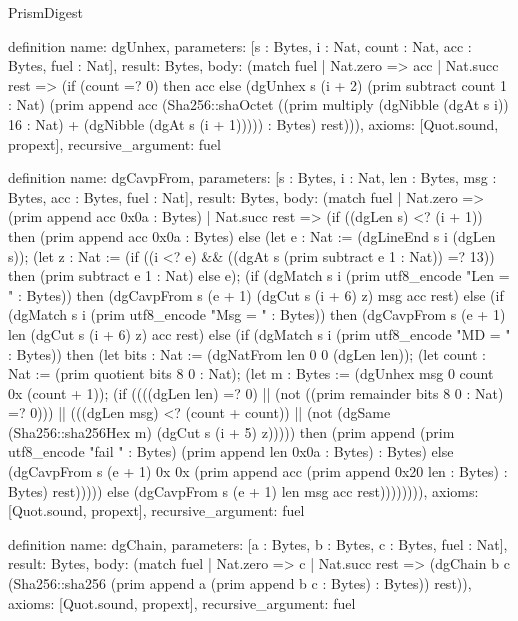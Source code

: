 \begin{lexlean}{PrismDigest}
\begin{semanticmodule}
definition{
  name: dgUnhex,
  parameters: [s : Bytes, i : Nat, count : Nat, acc : Bytes, fuel : Nat],
  result: Bytes,
  body: (match fuel
    | Nat.zero => acc
    | Nat.succ rest => (if (count =? 0) then acc else (dgUnhex s (i + 2) (prim subtract count 1 : Nat) (prim append acc (Sha256::shaOctet ((prim multiply (dgNibble (dgAt s i)) 16 : Nat) + (dgNibble (dgAt s (i + 1))))) : Bytes) rest))),
  axioms: [Quot.sound, propext],
  recursive_argument: fuel
}

definition{
  name: dgCavpFrom,
  parameters: [s : Bytes, i : Nat, len : Bytes, msg : Bytes, acc : Bytes, fuel : Nat],
  result: Bytes,
  body: (match fuel
    | Nat.zero => (prim append acc 0x0a : Bytes)
    | Nat.succ rest => (if ((dgLen s) <? (i + 1)) then (prim append acc 0x0a : Bytes) else (let e : Nat := (dgLineEnd s i (dgLen s)); (let z : Nat := (if ((i <? e) && ((dgAt s (prim subtract e 1 : Nat)) =? 13)) then (prim subtract e 1 : Nat) else e); (if (dgMatch s i (prim utf8_encode "Len = " : Bytes)) then (dgCavpFrom s (e + 1) (dgCut s (i + 6) z) msg acc rest) else (if (dgMatch s i (prim utf8_encode "Msg = " : Bytes)) then (dgCavpFrom s (e + 1) len (dgCut s (i + 6) z) acc rest) else (if (dgMatch s i (prim utf8_encode "MD = " : Bytes)) then (let bits : Nat := (dgNatFrom len 0 0 (dgLen len)); (let count : Nat := (prim quotient bits 8 0 : Nat); (let m : Bytes := (dgUnhex msg 0 count 0x (count + 1)); (if ((((dgLen len) =? 0) || (not ((prim remainder bits 8 0 : Nat) =? 0))) || (((dgLen msg) <? (count + count)) || (not (dgSame (Sha256::sha256Hex m) (dgCut s (i + 5) z))))) then (prim append (prim utf8_encode "fail " : Bytes) (prim append len 0x0a : Bytes) : Bytes) else (dgCavpFrom s (e + 1) 0x 0x (prim append acc (prim append 0x20 len : Bytes) : Bytes) rest))))) else (dgCavpFrom s (e + 1) len msg acc rest)))))))),
  axioms: [Quot.sound, propext],
  recursive_argument: fuel
}

definition{
  name: dgChain,
  parameters: [a : Bytes, b : Bytes, c : Bytes, fuel : Nat],
  result: Bytes,
  body: (match fuel
    | Nat.zero => c
    | Nat.succ rest => (dgChain b c (Sha256::sha256 (prim append a (prim append b c : Bytes) : Bytes)) rest)),
  axioms: [Quot.sound, propext],
  recursive_argument: fuel
}


\end{semanticmodule}
\end{lexlean}
